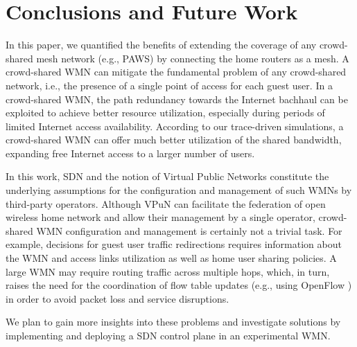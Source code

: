 \section{Conclusions and Future Work}
\label{sec:conclusion}

In this paper, we quantified the benefits of extending the coverage of any crowd-shared mesh network (e.g., PAWS) by connecting the home routers as a mesh. A crowd-shared WMN can mitigate the fundamental problem of any crowd-shared network, i.e., the presence of a single point of access for each guest user. In a crowd-shared WMN, the path redundancy towards the Internet bachhaul can be exploited to achieve better resource utilization, especially during periods of limited Internet access availability. According to our trace-driven simulations, a crowd-shared WMN can offer much better utilization of the shared bandwidth,  expanding free Internet access to a larger number of users.

In this work, SDN and the notion of Virtual Public Networks \cite{EWSDN} constitute the underlying assumptions for the configuration and management of such WMNs by third-party operators. Although VPuN can facilitate the federation of open wireless home network and allow their management by a single operator, crowd-shared WMN configuration and management is certainly not a trivial task. For example, decisions for guest user traffic redirections requires information about the WMN and access links utilization as well as home user sharing policies. A large WMN may require routing traffic across multiple hops, which, in turn, raises the need for the coordination of flow table updates (e.g., using OpenFlow \cite{OPENFLOW}) in order to avoid packet loss and service disruptions. 

We plan to gain more insights into these problems and investigate solutions by implementing and deploying a SDN control plane in an experimental WMN.  

